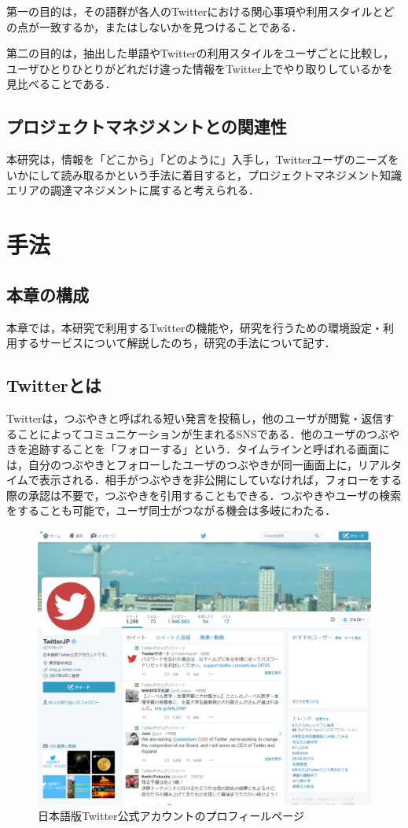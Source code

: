第一の目的は，その語群が各人のTwitterにおける関心事項や利用スタイルとどの点が一致するか，またはしないかを見つけることである．

第二の目的は，抽出した単語やTwitterの利用スタイルをユーザごとに比較し，ユーザひとりひとりがどれだけ違った情報をTwitter上でやり取りしているかを見比べることである．

\section{プロジェクトマネジメントとの関連性}
本研究は，情報を「どこから」「どのように」入手し，Twitterユーザのニーズをいかにして読み取るかという手法に着目すると，プロジェクトマネジメント知識エリアの調達マネジメントに属すると考えられる．

\chapter{手法}

\section{本章の構成}
本章では，本研究で利用するTwitterの機能や，研究を行うための環境設定・利用するサービスについて解説したのち，研究の手法について記す．

\section{Twitterとは}
Twitterは，つぶやきと呼ばれる短い発言を投稿し，他のユーザが閲覧・返信することによってコミュニケーションが生まれるSNSである．他のユーザのつぶやきを追跡することを「フォローする」という．タイムラインと呼ばれる画面には，自分のつぶやきとフォローしたユーザのつぶやきが同一画面上に，リアルタイムで表示される．相手がつぶやきを非公開にしていなければ，フォローをする際の承認は不要で，つぶやきを引用することもできる．つぶやきやユーザの検索をすることも可能で，ユーザ同士がつながる機会は多岐にわたる．

\begin{figure}[H]
\centering
\includegraphics[width=13cm]{TwitterJP.png}
\caption{日本語版Twitter公式アカウントのプロフィールページ}\label{TwitterJP}
\end{figure}


